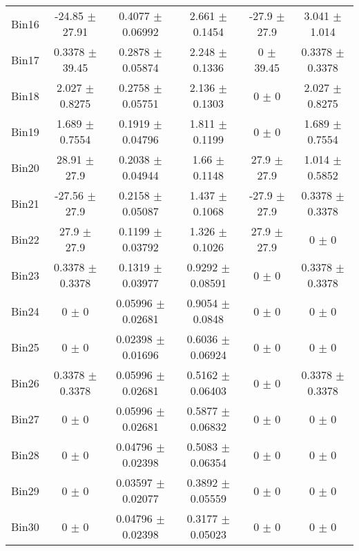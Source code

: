 \begin{tabular}{@{\extracolsep{4pt}}lccccc@{}}
     Bin16 & -24.85 $\pm$ 27.91 & 0.4077 $\pm$ 0.06992 & 2.661 $\pm$ 0.1454 & -27.9 $\pm$ 27.9 & 3.041 $\pm$ 1.014 \\ 
     Bin17 & 0.3378 $\pm$ 39.45 & 0.2878 $\pm$ 0.05874 & 2.248 $\pm$ 0.1336 & 0 $\pm$ 39.45 & 0.3378 $\pm$ 0.3378 \\ 
     Bin18 & 2.027 $\pm$ 0.8275 & 0.2758 $\pm$ 0.05751 & 2.136 $\pm$ 0.1303 & 0 $\pm$ 0 & 2.027 $\pm$ 0.8275 \\ 
     Bin19 & 1.689 $\pm$ 0.7554 & 0.1919 $\pm$ 0.04796 & 1.811 $\pm$ 0.1199 & 0 $\pm$ 0 & 1.689 $\pm$ 0.7554 \\ 
     Bin20 & 28.91 $\pm$ 27.9 & 0.2038 $\pm$ 0.04944 & 1.66 $\pm$ 0.1148 & 27.9 $\pm$ 27.9 & 1.014 $\pm$ 0.5852 \\ 
     Bin21 & -27.56 $\pm$ 27.9 & 0.2158 $\pm$ 0.05087 & 1.437 $\pm$ 0.1068 & -27.9 $\pm$ 27.9 & 0.3378 $\pm$ 0.3378 \\ 
     Bin22 & 27.9 $\pm$ 27.9 & 0.1199 $\pm$ 0.03792 & 1.326 $\pm$ 0.1026 & 27.9 $\pm$ 27.9 & 0 $\pm$ 0 \\ 
     Bin23 & 0.3378 $\pm$ 0.3378 & 0.1319 $\pm$ 0.03977 & 0.9292 $\pm$ 0.08591 & 0 $\pm$ 0 & 0.3378 $\pm$ 0.3378 \\ 
     Bin24 & 0 $\pm$ 0 & 0.05996 $\pm$ 0.02681 & 0.9054 $\pm$ 0.0848 & 0 $\pm$ 0 & 0 $\pm$ 0 \\ 
     Bin25 & 0 $\pm$ 0 & 0.02398 $\pm$ 0.01696 & 0.6036 $\pm$ 0.06924 & 0 $\pm$ 0 & 0 $\pm$ 0 \\ 
     Bin26 & 0.3378 $\pm$ 0.3378 & 0.05996 $\pm$ 0.02681 & 0.5162 $\pm$ 0.06403 & 0 $\pm$ 0 & 0.3378 $\pm$ 0.3378 \\ 
     Bin27 & 0 $\pm$ 0 & 0.05996 $\pm$ 0.02681 & 0.5877 $\pm$ 0.06832 & 0 $\pm$ 0 & 0 $\pm$ 0 \\ 
     Bin28 & 0 $\pm$ 0 & 0.04796 $\pm$ 0.02398 & 0.5083 $\pm$ 0.06354 & 0 $\pm$ 0 & 0 $\pm$ 0 \\ 
     Bin29 & 0 $\pm$ 0 & 0.03597 $\pm$ 0.02077 & 0.3892 $\pm$ 0.05559 & 0 $\pm$ 0 & 0 $\pm$ 0 \\ 
     Bin30 & 0 $\pm$ 0 & 0.04796 $\pm$ 0.02398 & 0.3177 $\pm$ 0.05023 & 0 $\pm$ 0 & 0 $\pm$ 0 \\ 
\hline\hline
  \end{tabular}

